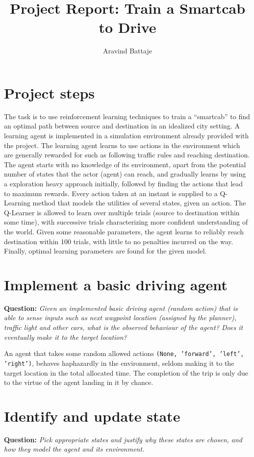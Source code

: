 \documentclass{article}
\begin{document}
	
	\title{Project Report: Train a Smartcab to Drive}
	\author{Aravind Battaje}
	\maketitle
	
	\section{Project steps}	
	The task is to use reinforcement learning techniques to train a ``smartcab'' to find an optimal path between source and destination in an idealized city setting. A learning agent is implemented in a simulation environment already provided with the project. The learning agent learns to use actions in the environment which are generally rewarded for such as following traffic rules and reaching destination. The agent starts with no knowledge of its environment, apart from the potential number of states that the actor (agent) can reach, and gradually learns by using a exploration heavy approach initially, followed by finding the actions that lead to maximum rewards. Every action taken at an instant is supplied to a Q-Learning method that models the utilities of several states, given an action. The Q-Learner is allowed to learn over multiple trials (source to destination within some time), with successive trials characterizing more confident understanding of the world. Given some reasonable parameters, the agent learns to reliably reach destination within 100 trials, with little to no penalties incurred on the way. Finally, optimal learning parameters are found for the given model. 
	
	\section{Implement a basic driving agent}
	\textbf{Question:} \emph{Given an implemented basic driving agent (random action) that is able to sense inputs such as next waypoint location (assigned by the planner), traffic light and other cars, what is the observed behaviour of the agent? Does it eventually make it to the target location?}
	
	An agent that takes some random allowed actions \texttt{(None, 'forward', 'left', 'right')}, behaves haphazardly in the environment, seldom making it to the target location in the total allocated time. The completion of the trip is only due to the virtue of the agent landing in it by chance.
	
	\section{Identify and update state}
	\textbf{Question:} \emph{Pick appropriate states and justify why these states are chosen, and how they model the agent and its environment.}
	
\end{document}
